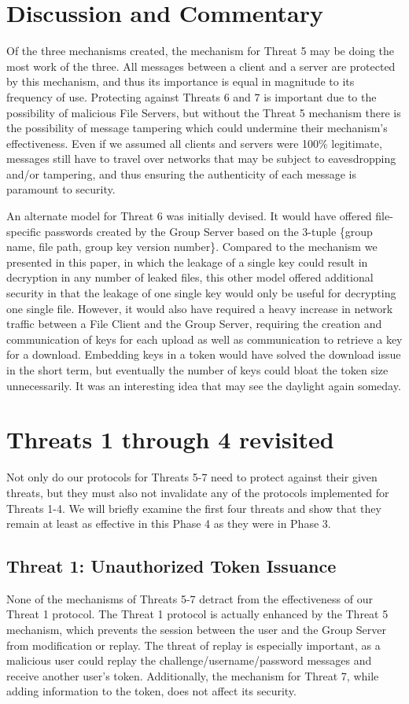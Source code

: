 \documentclass[11pt]{article}
\begin{document}
\section{Discussion and Commentary}
Of the three mechanisms created, the mechanism for Threat 5 may be doing the most work of the three. All messages between a client and a server are protected by this mechanism, and thus its importance is equal in magnitude to its frequency of use. Protecting against Threats 6 and 7 is important due to the possibility of malicious File Servers, but without the Threat 5 mechanism there is the possibility of message tampering which could undermine their mechanism's effectiveness. Even if we assumed all clients and servers were 100\% legitimate, messages still have to travel over networks that may be subject to eavesdropping and/or tampering, and thus ensuring the authenticity of each message is paramount to security.

An alternate model for Threat 6 was initially devised. It would have offered file-specific passwords created by the Group Server based on the 3-tuple \{group name, file path, group key version number\}. Compared to the mechanism we presented in this paper, in which the leakage of a single key could result in decryption in any number of leaked files, this other model offered additional security in that the leakage of one single key would only be useful for decrypting one single file. However, it would also have required a heavy increase in network traffic between a File Client and the Group Server, requiring the creation and communication of keys for each upload as well as communication to retrieve a key for a download. Embedding keys in a token would have solved the download issue in the short term, but eventually the number of keys could bloat the token size unnecessarily. It was an interesting idea that may see the daylight again someday.
\section{Threats 1 through 4 revisited}
Not only do our protocols for Threats 5-7 need to protect against their given threats, but they must also not invalidate any of the protocols implemented for Threats 1-4. We will briefly examine the first four threats and show that they remain at least as effective in this Phase 4 as they were in Phase 3.
\subsection{Threat 1: Unauthorized Token Issuance}
None of the mechanisms of Threats 5-7 detract from the effectiveness of our Threat 1 protocol. The Threat 1 protocol is actually enhanced by the Threat 5 mechanism, which prevents the session between the user and the Group Server from modification or replay. The threat of replay is especially important, as a malicious user could replay the challenge/username/password messages and receive another user's token. Additionally, the mechanism for Threat 7, while adding information to the token, does not affect its security.
\end{document}
